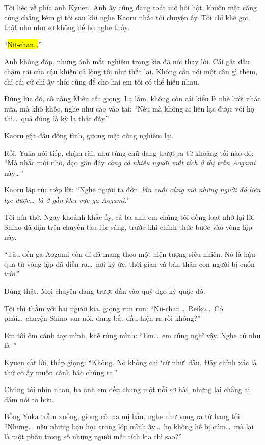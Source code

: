 \documentclass[../main.tex]{subfiles}
\begin{document}
Tôi liếc về phía anh Kyuen. Anh ấy cũng đang toát mồ hôi hột, khuôn mặt căng cứng chẳng kém gì tôi sau khi nghe Kaoru nhắc tới chuyện ấy. Tôi chỉ khẽ gọi, thật nhỏ như sợ không để họ nghe thấy.

``\hl{Nii-chan\dots}''

Anh không đáp, nhưng ánh mắt nghiêm trọng kia đã nói thay lời. Cái gật đầu chậm rãi của cậu khiến cả lòng tôi như thắt lại. Không cần nói một câu gì thêm, chỉ cái cử chỉ ấy thôi cũng để cho hai em tôi có thể hiểu nhau.

Đúng lúc đó, cô nàng Miêu cất giọng. Lạ lắm, không còn cái kiểu lè nhè lười nhác nữa, mà khô khốc, nghe như cào vào tai: ``Nếu mà không ai liên lạc được với họ thì\dots\ quả đúng là kỳ lạ thật đấy.''

Kaoru gật đầu đồng tình, gương mặt cũng nghiêm lại.

Rồi, Yuka nói tiếp, chậm rãi, như từng chữ đang trượt ra từ khoảng tối nào đó: ``Mà nhắc mới nhớ, dạo gần đây \emph{càng có nhiều người mất tích ở thị trấn Aogami} này\dots''

Kaoru lập tức tiếp lời: ``Nghe người ta đồn, \emph{lần cuối cùng mà những người đó liên lạc được\dots\ là ở gần khu vực ga Aogami.}''


Tôi nín thở. Ngay khoảnh khắc ấy, cả ba anh em chúng tôi đồng loạt nhớ lại lời Shino đã dặn trên chuyến tàu lúc sáng, trước khi chính thức bước vào vòng lặp này.

``Tàu đến ga Aogami vốn dĩ đã mang theo một hiện tượng siêu nhiên. Nó là hậu quả từ vòng lặp đã diễn ra\dots\ nơi ký ức, thời gian và bản thân con người bị cuốn trôi.''

Đúng thật. Mọi chuyện đang trượt dần vào quỹ đạo kỳ quặc đó.

Tôi thì thầm với hai người kia, giọng run run: ``Nii-chan\dots\ Reiko\dots\ Có phải\dots\ chuyện Shino-san nói, đang bắt đầu hiện ra rồi không?''

Em tôi ôm cánh tay mình, khẽ rùng mình: ``Em\dots\ em cũng nghĩ vậy. Nghe cứ như là--''

Kyuen cắt lời, thấp giọng:
``Không. Nó không chỉ `cứ như' đâu. Đây chính xác là thứ cô ấy muốn cảnh báo chúng ta.''

Chúng tôi nhìn nhau, ba anh em đều chung một nỗi sợ hãi, nhưng lại chẳng ai dám nói to hơn.

Bỗng Yuka trầm xuống, giọng cô ma mị hẳn, nghe như vọng ra từ hang tối: ``Nhưng\dots\ nếu những bạn học trong lớp mình ấy\dots\ họ không hề bị cúm\dots\ mà lại là một phần trong số những người mất tích kia thì sao?''
\end{document}
